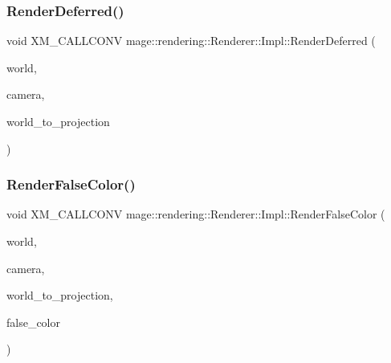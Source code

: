 \hypertarget{classmage_1_1rendering_1_1_renderer_1_1_impl_add8f54938b1bd940a032e5165c60a09a}{}\label{classmage_1_1rendering_1_1_renderer_1_1_impl_add8f54938b1bd940a032e5165c60a09a} 
\subsubsection{\texorpdfstring{Render\+Deferred()}{RenderDeferred()}}
{\footnotesize\ttfamily void X\+M\+\_\+\+C\+A\+L\+L\+C\+O\+NV mage\+::rendering\+::\+Renderer\+::\+Impl\+::\+Render\+Deferred (\begin{DoxyParamCaption}\item[{const \hyperlink{classmage_1_1rendering_1_1_world}{World} \&}]{world,  }\item[{const \hyperlink{classmage_1_1rendering_1_1_camera}{Camera} \&}]{camera,  }\item[{F\+X\+M\+M\+A\+T\+R\+IX}]{world\+\_\+to\+\_\+projection }\end{DoxyParamCaption})\hspace{0.3cm}{\ttfamily [private]}}

\hypertarget{classmage_1_1rendering_1_1_renderer_1_1_impl_aecb98e030f5486bbd31384af5b6e77b0}{}\label{classmage_1_1rendering_1_1_renderer_1_1_impl_aecb98e030f5486bbd31384af5b6e77b0} 
\subsubsection{\texorpdfstring{Render\+False\+Color()}{RenderFalseColor()}}
{\footnotesize\ttfamily void X\+M\+\_\+\+C\+A\+L\+L\+C\+O\+NV mage\+::rendering\+::\+Renderer\+::\+Impl\+::\+Render\+False\+Color (\begin{DoxyParamCaption}\item[{const \hyperlink{classmage_1_1rendering_1_1_world}{World} \&}]{world,  }\item[{const \hyperlink{classmage_1_1rendering_1_1_camera}{Camera} \&}]{camera,  }\item[{F\+X\+M\+M\+A\+T\+R\+IX}]{world\+\_\+to\+\_\+projection,  }\item[{\hyperlink{namespacemage_1_1rendering_a6c3d1f4e7a5ae72dc07226e971205534}{False\+Color}}]{false\+\_\+color }\end{DoxyParamCaption})\hspace{0.3cm}{\ttfamily [private]}}

